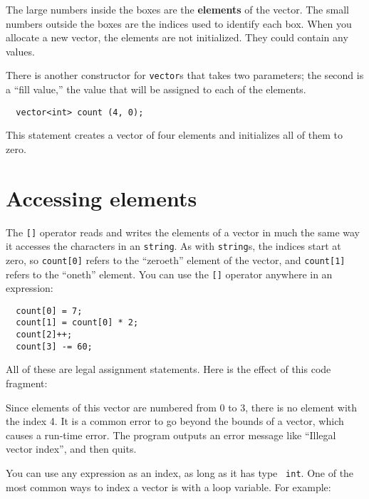 \vspace{0.1in}
\centerline{}
\vspace{0.1in}

The large numbers inside the boxes are the {\bf elements} of
the vector.  The small numbers outside the boxes are the
indices used to identify each box.  When you allocate a new
vector, the elements are not initialized.  They could contain
any values.

There is another constructor for {\tt vector}s that takes
two parameters; the second is a ``fill value,'' the
value that will be assigned to each of the elements.

\begin{lstlisting}
  vector<int> count (4, 0);
\end{lstlisting}
%
This statement creates a vector of four elements and initializes
all of them to zero.

\section{Accessing elements}

The {\tt []} operator reads and writes the elements of a vector in
much the same way it accesses the characters in an {\tt string}.  As
with {\tt string}s, the indices start at zero, so {\tt count[0]}
refers to the ``zeroeth'' element of the vector, and {\tt count[1]}
refers to the ``oneth'' element.  You can use the {\tt []} operator
anywhere in an expression:

\begin{lstlisting}
  count[0] = 7;
  count[1] = count[0] * 2;
  count[2]++;
  count[3] -= 60;
\end{lstlisting}
%
All of these are legal assignment statements.  Here is the
effect of this code fragment:

\vspace{0.1in}
\centerline{}
\vspace{0.1in}

Since elements of this vector are numbered from 0 to 3, there is no
element with the index 4.  It is a common error to go beyond the
bounds of a vector, which causes a run-time error.  The program outputs
an error message like ``Illegal vector index'', and then quits.


You can use any expression as an index, as long as it has type {\tt
int}.  One of the most common ways to index a vector is with a loop
variable.  For example:

